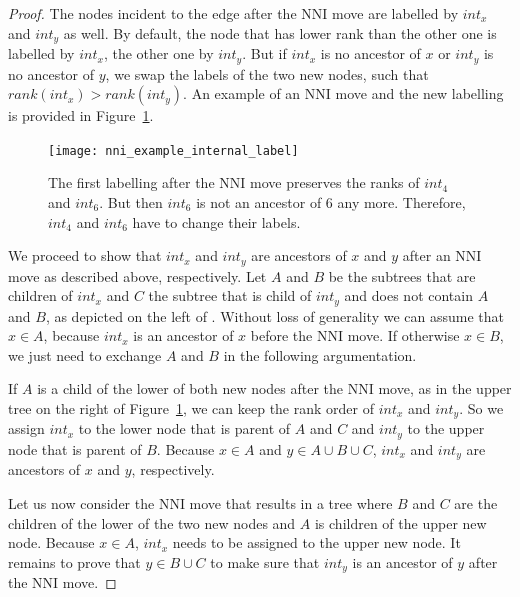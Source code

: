 \documentclass[11pt, a4paper]{article}
\newcommand{\nni}{\mathrm{NNI}}
\begin{document}
\begin{proof}
	The nodes incident to the edge after the $\nni$ move are labelled by $int_x$ and $int_y$ as well.
	By default, the node that has lower rank than the other one is labelled by $int_x$, the other one by $int_y$.
	But if $int_x$ is no ancestor of $x$ or $int_y$ is no ancestor of $y$, we swap the labels of the two new nodes, such that $rank(int_x) > rank(int_y)$.
	An example of an $\nni$ move and the new labelling is provided in Figure~\ref{fig:nni_example_internal_label}.

	\begin{figure}[H]
		\centering
		\texttt{[image: nni\_example\_internal\_label]}
		\caption{The first labelling after the $\nni$ move preserves the ranks of $int_4$ and $int_6$.
		But then $int_6$ is not an ancestor of $6$ any more.
		Therefore, $int_4$ and $int_6$ have to change their labels.
		}
		\label{fig:nni_example_internal_label}
	\end{figure}

	We proceed to show that $int_x$ and $int_y$ are ancestors of $x$ and $y$ after an $\nni$ move as described above, respectively.
	Let $A$ and $B$ be the subtrees that are children of $int_x$ and $C$ the subtree that is child of $int_y$ and does not contain $A$ and $B$, as depicted on the left of .
	Without loss of generality we can assume that $x \in A$, because $int_x$ is an ancestor of $x$ before the $\nni$ move.
	If otherwise $x\in B$, we just need to exchange $A$ and $B$ in the following argumentation.

	If $A$ is a child of the lower of both new nodes after the $\nni$ move, as in the upper tree on the right of Figure~\ref{fig:nni_example_internal_label}, we can keep the rank order of $int_x$ and $int_y$.
	So we assign $int_x$ to the lower node that is parent of $A$ and $C$ and $int_y$ to the upper node that is parent of $B$.
	Because $x \in A$ and $y \in A \cup B \cup C$, $int_x$ and $int_y$ are ancestors of $x$ and $y$, respectively.

	Let us now consider the $\nni$ move that results in a tree where $B$ and $C$ are the children of the lower of the two new nodes and $A$ is children of the upper new node.
	Because $x \in A$, $int_x$ needs to be assigned to the upper new node.
	It remains to prove that $y \in B \cup C$ to make sure that $int_y$ is an ancestor of $y$ after the $\nni$ move.


\end{proof}
\end{document}
